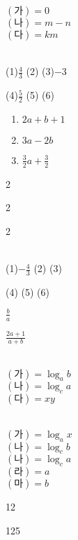 \documentclass{oblivoir}
\begin{document}
\begin{multicols*}{2}
%
\\[-10pt]
\((가)=0\)\\
\((나)=m-n\)\\
\((다)=km\)

%
\\[-15pt]
(1)\:\(\frac43\)
(2)
(3)\:\(-3\)
\par\noindent
(4)\:\(\frac52\)
(5)
(6)

\columnbreak
%
\begin{enumerate}
\setcounter{enumi}1
\item
\(2a+b+1\)
\item
\(3a-2b\)
\item
\(\frac32a+\frac32\)
\end{enumerate}

%
\begin{enumerate*}[itemjoin=\qquad]
\item
2
\item
2
\item
2
\end{enumerate*}

%
\\[-15pt]
(1)\:\(-\frac43\)
(2)
(3)
\par\noindent
(4)
(5)
(6)

%
\begin{enumerate*}[itemjoin=\qquad]
\item
\(\frac ba\)
\item
\(\frac{2a+1}{a+b}\)
\end{enumerate*}

%
\\
\((가)=\log_ab\)\\
\((나)=\log_ca\)\\
\((다)=xy\)

%
\\
\((가)=\log_ax\)\\
\((나)=\log_cb\)\\
\((나)=\log_ca\)\\
\((라)=a\)\\
\((마)=b\)

%
\begin{enumerate*}[itemjoin=\qquad\qquad]
\item
12
\item
125
\end{enumerate*}


\end{multicols*}
\end{document}
